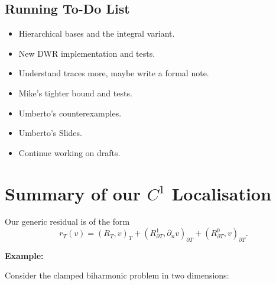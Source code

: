 \documentclass[12pt,a4paper]{article}
\newcommand{\dn}{\partial_n}
\newcommand{\Rone}{R_{\partial T}^{1}}
\newcommand{\Rzero}{R_{\partial T}^{0}}
\begin{document}
\subsection{Running To-Do List}

\begin{itemize}
    \item Hierarchical bases and the integral variant.
    \item New DWR implementation and tests. 
    \item Understand traces more, maybe write a formal note. 
    \item Mike's tighter bound and tests.
    \item Umberto's counterexamples.
    \item Umberto's Slides.
    \item Continue working on drafts. 
\end{itemize}

\newpage 
\section{Summary of our $C^1$ Localisation}


Our generic residual is of the form
\begin{equation}
    r_T(v)
    =(R_T,v)_T
      +(\Rone,\dn v)_{\partial T}
      +(\Rzero,v)_{\partial T}.
\end{equation}

\textbf{Example:}

Consider the clamped biharmonic problem in two dimensions:
\end{document}
